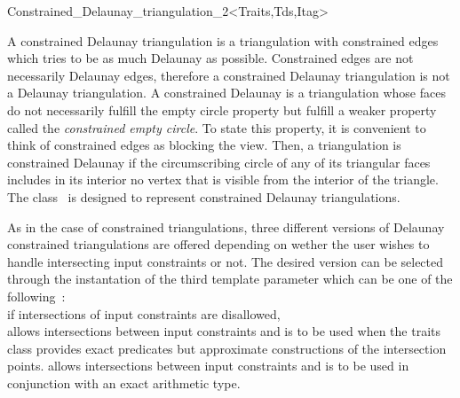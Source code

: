

\begin{ccRefClass}{Constrained_Delaunay_triangulation_2<Traits,Tds,Itag>}  %


\ccDefinition
A constrained Delaunay triangulation is a triangulation with
constrained edges which tries to be as much Delaunay as possible.
Constrained edges are not necessarily Delaunay edges,
therefore a constrained Delaunay triangulation is not a Delaunay
triangulation. A constrained Delaunay is a triangulation
whose faces do not
necessarily fulfill the empty circle property
but fulfill a weaker property called the
{\em constrained empty circle}.
 To state this property,
it is convenient to think of  constrained
edges as blocking the view. Then, a triangulation is 
constrained Delaunay if
 the circumscribing circle
of any of its triangular faces includes in its interior 
no vertex  that is visible
from the interior of the triangle.  
The class \ccRefName\ is designed to represent
constrained Delaunay triangulations.

As in the case of constrained triangulations, three different versions
of Delaunay constrained triangulations are offered
depending on wether the user wishes to handle
intersecting input constraints or not.
The desired version can  be selected through the instantation of the
third template parameter  which can be one of the
following~: \\
 if  intersections of
 input constraints are disallowed,\\
 allows intersections between input
constraints
 and is to be used when the traits
class
provides exact predicates but approximate constructions of the
intersection points.
 allows intersections between input
constraints
 and is to be used in conjunction
with an exact arithmetic type.



\end{ccRefClass}

